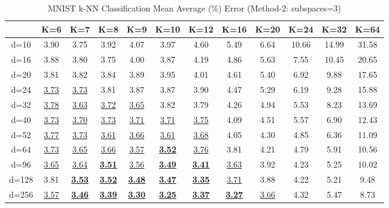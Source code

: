 \begin{table}[H]
\centering
\label{tab:table2}
\begin{tabular}{|c|c|c|c|c|c|c|c|c|c|c|c|}
\hline
& K=6 & K=7 & K=8 & K=9 & K=10 & K=12 & K=16 & K=20 & K=24 & K=32 & K=64 \\
\hline
d=10 & 3.90 & 3.75 & 3.92 & 4.07 & 3.97 & 4.60 & 5.49 & 6.64 & 10.66 & 14.99 & 31.58 \\
d=16 & 3.88 & 3.80 & 3.75 & 4.00 & 3.87 & 4.19 & 4.86 & 5.63 & 7.55 & 10.45 & 20.65 \\
d=20 & 3.81 & 3.82 & 3.84 & 3.89 & 3.95 & 4.01 & 4.61 & 5.40 & 6.92 & 9.88 & 17.65 \\
d=24 & \underline{3.73} & \underline{3.73} & 3.81 & 3.87 & 3.87 & 3.90 & 4.47 & 5.29 & 6.19 & 9.28 & 15.88 \\
d=32 & \underline{3.78} & \underline{3.63} & \underline{3.72} & \underline{3.65} & 3.82 & 3.79 & 4.26 & 4.94 & 5.53 & 8.23 & 13.69 \\
d=40 & \underline{3.73} & \underline{3.70} & \underline{3.73} & \underline{3.71} & \underline{3.71} & \underline{3.75} & 4.09 & 4.51 & 5.57 & 6.90 & 12.43 \\
d=52 & \underline{3.77} & \underline{3.73} & \underline{3.61} & \underline{3.66} & \underline{3.61} & \underline{3.68} & 4.05 & 4.30 & 4.85 & 6.36 & 11.09 \\
d=64 & \underline{3.73} & \underline{3.65} & \underline{3.66} & \underline{3.57} & \underline{\textbf{3.52}} & \underline{3.76} & 3.81 & 4.21 & 4.79 & 5.91 & 10.56 \\
d=96 & \underline{3.65} & \underline{3.64} & \underline{\textbf{3.51}} & \underline{3.56} & \underline{\textbf{3.49}} & \underline{\textbf{3.41}} & \underline{3.63} & 3.92 & 4.23 & 5.25 & 10.02 \\
d=128 & 3.81 & \underline{\textbf{3.53}} & \underline{\textbf{3.52}} & \underline{\textbf{3.48}} & \underline{\textbf{3.47}} & \underline{\textbf{3.35}} & \underline{3.71} & 3.88 & 4.22 & 5.21 & 9.48 \\
d=256 & \underline{3.57} & \underline{\textbf{3.46}} & \underline{\textbf{3.39}} & \underline{\textbf{3.30}} & \underline{\textbf{3.25}} & \underline{\textbf{3.37}} & \underline{\textbf{3.27}} & \underline{3.66} & 4.32 & 5.47 & 8.73 \\
\hline
\end{tabular}
\caption{MNIST k-NN Classification Mean Average (\%) Error (Method-2: subspaces=3)}
\end{table}

